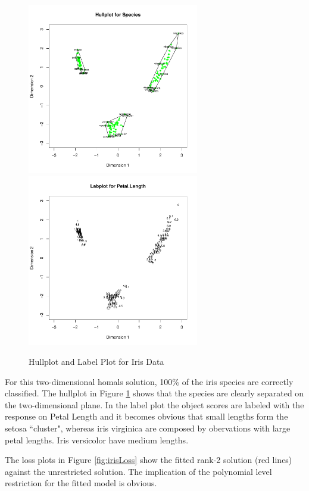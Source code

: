 \documentclass[article]{jss1}
\begin{document}
\begin{figure}[hbt]
\begin{center}
\includegraphics[height=75mm, width=75mm]{irisHull.pdf}
\includegraphics[height=75mm, width=75mm]{irisLab.pdf}
\caption{\label{fig:iris}Hullplot and Label Plot for Iris Data}
\end{center}
\end{figure}

For this two-dimensional homals solution, 100\% of the iris species are correctly classified. The hullplot in Figure \ref{fig:iris} shows that the species are clearly separated on the two-dimensional plane. In the label plot the object scores are labeled with the response on Petal Length and it becomes obvious that small lengths form the setosa ``cluster", whereas iris virginica are composed by obervations with large petal lengths. Iris versicolor have medium lengths. 

The loss plots in Figure \ref{fig:irisLoss} show the fitted rank-2 solution (red lines) against the unrestricted solution. The implication of the polynomial level restriction for the fitted model is obvious.
\end{document}

